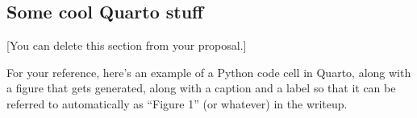 \documentclass[
  letterpaper,
  DIV=11,
  numbers=noendperiod]{scrartcl}
\begin{document}
\subsection{Some cool Quarto stuff}\label{some-cool-quarto-stuff}

{[}You can delete this section from your proposal.{]}

For your reference, here's an example of a Python code cell in Quarto,
along with a figure that gets generated, along with a caption and a
label so that it can be referred to automatically as ``Figure 1'' (or
whatever) in the writeup.
\end{document}
